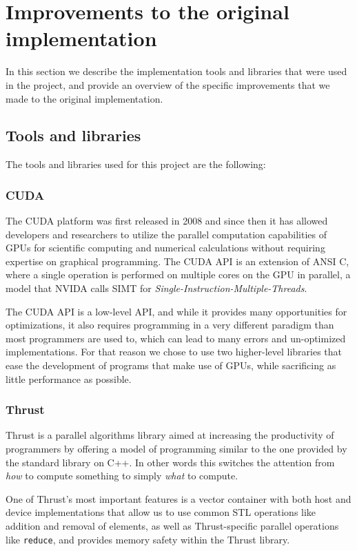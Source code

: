 \documentclass[11pt,a4paper]{article}
\begin{document}
\section{Improvements to the original implementation}
\label{sec:improvement}

In this section we describe the implementation tools and libraries that were used in the project,
and provide an overview of the specific improvements that we made to the original implementation.

\subsection{Tools and libraries}

The tools and libraries used for this project are the following:

\subsubsection{CUDA}
The CUDA platform was first released in 2008 \cite{nickolls2008scalable} and since then it has
allowed developers and researchers to utilize the parallel computation capabilities of GPUs for scientific computing
and numerical calculations without requiring expertise on graphical programming. The CUDA API is an extension of
ANSI C, where a single operation is performed on multiple cores on the GPU in parallel, a model
that NVIDA calls SIMT for \textit{Single-Instruction-Multiple-Threads}.

The CUDA API is a low-level API, and while it provides many opportunities for optimizations, it
also requires programming in a very different paradigm than most programmers are used to, which
can lead to many errors and un-optimized implementations. For that reason we chose to use
two higher-level libraries that ease the development of programs that make use of GPUs, while
sacrificing as little performance as possible.

\subsubsection{Thrust}
Thrust \cite{bell2012thrust} is a parallel algorithms library aimed at increasing the productivity of programmers by
offering a model of programming similar to the one provided by the standard library on C++.
In other words this switches the attention from \textit{how} to compute
something to simply \textit{what} to compute. 

One of Thrust's most important features is a vector container with both host and device implementations that allow us
to use common STL operations like addition and removal of elements, as well as Thrust-specific parallel operations like \texttt{reduce}, and provides memory safety within the Thrust library.
\end{document}
